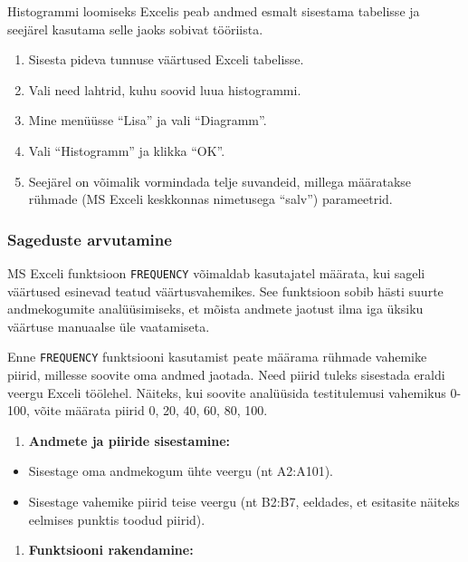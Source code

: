 \documentclass[
]{book}
\providecommand{\tightlist}{%
  \setlength{\itemsep}{0pt}\setlength{\parskip}{0pt}}
\begin{document}
Histogrammi loomiseks Excelis peab andmed esmalt sisestama tabelisse ja seejärel kasutama selle jaoks sobivat tööriista.

\begin{enumerate}
\def\labelenumi{\arabic{enumi}.}
\tightlist
\item
  Sisesta pideva tunnuse väärtused Exceli tabelisse.
\item
  Vali need lahtrid, kuhu soovid luua histogrammi.
\item
  Mine menüüsse ``Lisa'' ja vali ``Diagramm''.
\item
  Vali ``Histogramm'' ja klikka ``OK''.
\item
  Seejärel on võimalik vormindada telje suvandeid, millega määratakse rühmade (MS Exceli keskkonnas nimetusega ``salv'') parameetrid.
\end{enumerate}

\subsubsection{Sageduste arvutamine}\label{sageduste-arvutamine-1}

MS Exceli funktsioon \texttt{FREQUENCY} võimaldab kasutajatel määrata, kui sageli väärtused esinevad teatud väärtusvahemikes. See funktsioon sobib hästi suurte andmekogumite analüüsimiseks, et mõista andmete jaotust ilma iga üksiku väärtuse manuaalse üle vaatamiseta.

Enne \texttt{FREQUENCY} funktsiooni kasutamist peate määrama rühmade vahemike piirid, millesse soovite oma andmed jaotada. Need piirid tuleks sisestada eraldi veergu Exceli töölehel. Näiteks, kui soovite analüüsida testitulemusi vahemikus 0-100, võite määrata piirid 0, 20, 40, 60, 80, 100.

\begin{enumerate}
\def\labelenumi{\arabic{enumi}.}
\tightlist
\item
  \textbf{Andmete ja piiride sisestamine:}
\end{enumerate}

\begin{itemize}
\tightlist
\item
  Sisestage oma andmekogum ühte veergu (nt A2:A101).
\item
  Sisestage vahemike piirid teise veergu (nt B2:B7, eeldades, et esitasite näiteks eelmises punktis toodud piirid).
\end{itemize}

\begin{enumerate}
\def\labelenumi{\arabic{enumi}.}
\setcounter{enumi}{1}
\tightlist
\item
  \textbf{Funktsiooni rakendamine:}
\end{enumerate}
\end{document}
